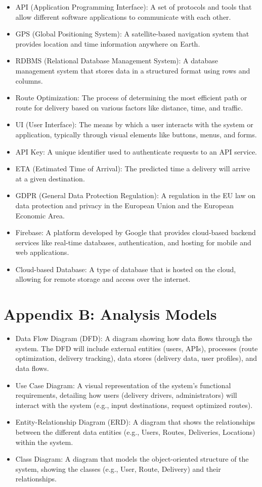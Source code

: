 \begin{itemize}
    \item API (Application Programming Interface): A set of protocols and tools that allow different software applications to communicate with each other.
    \item GPS (Global Positioning System): A satellite-based navigation system that provides location and time information anywhere on Earth.
    \item RDBMS (Relational Database Management System): A database management system that stores data in a structured format using rows and columns.
    \item Route Optimization: The process of determining the most efficient path or route for delivery based on various factors like distance, time, and traffic.
    \item UI (User Interface): The means by which a user interacts with the system or application, typically through visual elements like buttons, menus, and forms.
    \item API Key: A unique identifier used to authenticate requests to an API service.
    \item ETA (Estimated Time of Arrival): The predicted time a delivery will arrive at a given destination.
    \item GDPR (General Data Protection Regulation): A regulation in the EU law on data protection and privacy in the European Union and the European Economic Area.
    \item Firebase: A platform developed by Google that provides cloud-based backend services like real-time databases, authentication, and hosting for mobile and web applications.
    \item Cloud-based Database: A type of database that is hosted on the cloud, allowing for remote storage and access over the internet.
\end{itemize}

\section{Appendix B: Analysis Models}

\begin{itemize}
    \item Data Flow Diagram (DFD): A diagram showing how data flows through the system. The DFD will include external entities (users, APIs), processes (route optimization, delivery tracking), data stores (delivery data, user profiles), and data flows.
    \item Use Case Diagram: A visual representation of the system's functional requirements, detailing how users (delivery drivers, administrators) will interact with the system (e.g., input destinations, request optimized routes).
    \item Entity-Relationship Diagram (ERD): A diagram that shows the relationships between the different data entities (e.g., Users, Routes, Deliveries, Locations) within the system.
    \item Class Diagram: A diagram that models the object-oriented structure of the system, showing the classes (e.g., User, Route, Delivery) and their relationships.
\end{itemize}


